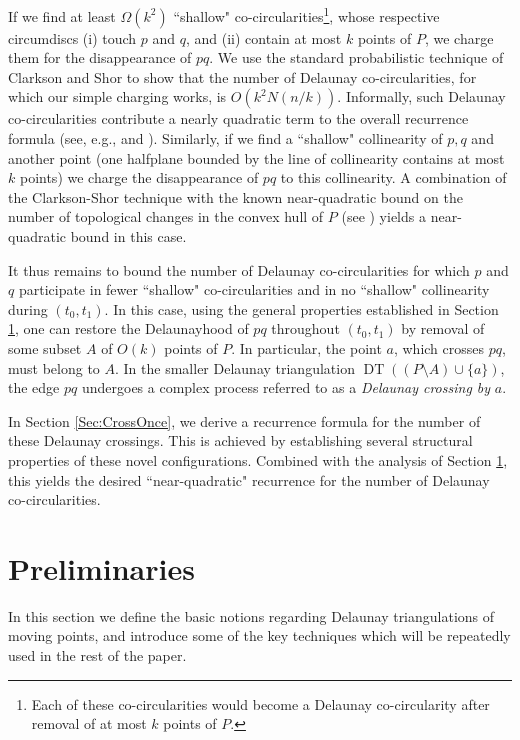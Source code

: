 \documentclass[letter,11pt]{article}
\def\DT{\mathop{\mathrm{DT}}}
\begin{document}
If we find at least $\Omega(k^2)$ ``shallow" co-circularities\footnote{Each of these co-circularities would become a Delaunay co-circularity after removal of at most $k$ points of $P$.}, whose respective circumdiscs (i) touch $p$ and $q$, and (ii) contain at most $k$ points of $P$, we charge them for the disappearance of $pq$. We use the standard probabilistic technique of Clarkson and Shor \cite{CS} to show that the number of Delaunay co-circularities, for which our simple charging works, is $O\left(k^2N(n/k)\right)$.
Informally, such Delaunay co-circularities contribute a nearly quadratic term to the overall recurrence formula (see, e.g., \cite{ASS} and \cite{ConstantLines}). Similarly, if we find a ``shallow" collinearity of $p,q$ and another point (one halfplane bounded by the line of collinearity contains at most $k$ points) we charge the disappearance of $pq$ to this collinearity. A combination of the Clarkson-Shor technique with the known near-quadratic bound on the number of topological changes in the convex hull of $P$ (see \cite[Section 8.6.1]{SA95}) yields a near-quadratic bound in this case.

It thus remains to bound the number of Delaunay co-circularities for which $p$ and $q$ participate in fewer ``shallow" co-circularities and in no ``shallow" collinearity during $(t_0,t_1)$. In this case, using the general properties established in Section \ref{Sec:Prelim}, one can restore the Delaunayhood of $pq$ throughout $(t_0,t_1)$ by removal of some subset $A$ of $O(k)$ points of $P$. In particular, the point $a$, which crosses $pq$, must belong to $A$.
In the smaller Delaunay triangulation $\DT\left((P\setminus A) \cup\{a\}\right)$, the edge $pq$ undergoes a complex process referred to as a {\it Delaunay crossing by} $a$. 

In Section \ref{Sec:CrossOnce}, we derive a recurrence formula for the number of these Delaunay crossings. 
This is achieved by establishing several structural properties of these novel configurations.
Combined with the analysis of Section \ref{Sec:Prelim}, this yields the desired ``near-quadratic" recurrence for the number of Delaunay co-circularities. 



\section{Preliminaries}\label{Sec:Prelim}
In this section we define the basic notions regarding Delaunay triangulations of moving points, and introduce some of the key techniques which will be repeatedly used in the rest of the paper. 
\end{document}
